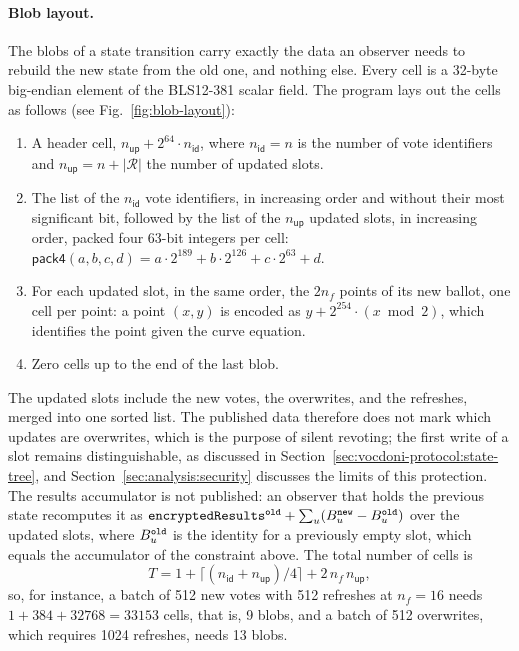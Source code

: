 \paragraph{Blob layout.}
\label{sec:vocdoni-protocol:circuits:blobs}
The blobs of a state transition carry exactly the data an observer needs to rebuild the new state from the old one, and nothing else. Every cell is a 32-byte big-endian element of the BLS12-381 scalar field. The program lays out the cells as follows (see Fig.~\ref{fig:blob-layout}):
\begin{enumerate}
	\item A header cell, $n_{\mathsf{up}} + 2^{64} \cdot n_{\mathsf{id}}$, where $n_{\mathsf{id}} = n$ is the number of vote identifiers and $n_{\mathsf{up}} = n + |\mathcal{R}|$ the number of updated slots.
	\item The list of the $n_{\mathsf{id}}$ vote identifiers, in increasing order and without their most significant bit, followed by the list of the $n_{\mathsf{up}}$ updated slots, in increasing order, packed four 63-bit integers per cell: $\mathsf{pack4}(a,b,c,d) = a \cdot 2^{189} + b \cdot 2^{126} + c \cdot 2^{63} + d$.
	\item For each updated slot, in the same order, the $2 n_f$ points of its new ballot, one cell per point: a point $(x,y)$ is encoded as $y + 2^{254} \cdot (x \bmod 2)$, which identifies the point given the curve equation.
	\item Zero cells up to the end of the last blob.
\end{enumerate}
The updated slots include the new votes, the overwrites, and the refreshes, merged into one sorted list. The published data therefore does not mark which updates are overwrites, which is the purpose of silent revoting; the first write of a slot remains distinguishable, as discussed in Section~\ref{sec:vocdoni-protocol:state-tree}, and Section~\ref{sec:analysis:security} discusses the limits of this protection. The results accumulator is not published: an observer that holds the previous state recomputes it as $\texttt{encryptedResults}^\texttt{old} + \sum_{u} (B^\texttt{new}_u - B^\texttt{old}_u)$ over the updated slots, where $B^\texttt{old}_u$ is the identity for a previously empty slot, which equals the accumulator of the constraint above. The total number of cells is
\[
T = 1 + \bigl\lceil (n_{\mathsf{id}} + n_{\mathsf{up}})/4 \bigr\rceil + 2\, n_f\, n_{\mathsf{up}},
\]
so, for instance, a batch of 512 new votes with 512 refreshes at $n_f = 16$ needs $1 + 384 + 32768 = 33153$ cells, that is, 9 blobs, and a batch of 512 overwrites, which requires 1024 refreshes, needs 13 blobs.

